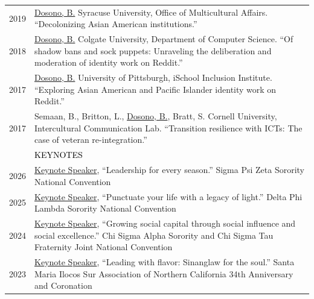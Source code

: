\documentclass[12pt]{article}
\begin{document}
{\begin{longtable}{R{0.75in}p{5.0in}}
\footnotesize{2019} & \href{https://news.syr.edu/blog/2019/03/22/celebrate-asian-american-and-pacific-islander-heritage-month-this-april/}{Dosono, B.} Syracuse University, Office of Multicultural Affairs. ``Decolonizing Asian American institutions.''\\

\footnotesize{2018} & \href{https://web.archive.org/web/20220125203815/https://cs.colgate.edu/cs/events/151/}{Dosono, B.} Colgate University, Department of Computer Science. ``Of shadow bans and sock puppets: Unraveling the deliberation and moderation of identity work on Reddit.''\\

\footnotesize{2017} & \href{https://www.sis.pitt.edu/i3/i3-cohorts/2017/schedule.html}{Dosono, B.} University of Pittsburgh, iSchool Inclusion Institute. ``Exploring Asian American and Pacific Islander identity work on Reddit.''\\

\footnotesize{2017} & Semaan, B., Britton, L., \href{https://bit.ly/CornellTalk}{Dosono, B.}, Bratt, S. Cornell University, Intercultural Communication Lab. ``Transition resilience with ICTs: The case of veteran re-integration.'' \medskip \\

& \large \textcolor{black}{\uppercase{Keynotes}}\\

\footnotesize{2026} & \href{https://sigmapsizeta.org/}{Keynote Speaker}, ``Leadership for every season.'' Sigma Psi Zeta Sorority National Convention\\

\footnotesize{2025} & \href{https://issuu.com/deltaphilambda/docs/dfl_national_convention_recap_report_2025/6}{Keynote Speaker}, ``Punctuate your life with a legacy of light.'' Delta Phi Lambda Sorority National Convention\\

\footnotesize{2024} & \href{https://www.chisigmaalpha.org/}{Keynote Speaker}, ``Growing social capital through social influence and social excellence.'' Chi Sigma Alpha Sorority and Chi Sigma Tau Fraternity Joint National Convention\\

\footnotesize{2023} & \href{https://youtu.be/xVtNAAYKqtg}{Keynote Speaker}, ``Leading with flavor: Sinanglaw for the soul.'' Santa Maria Ilocos Sur Association of Northern California 34th Anniversary and Coronation\\


\end{longtable}}
\end{document}
